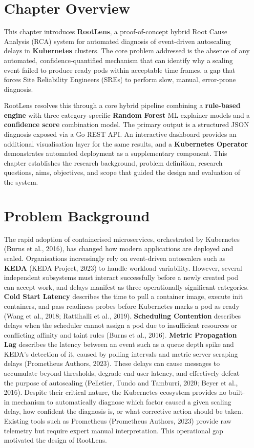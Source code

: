 
\section{Chapter Overview}
This chapter introduces \textbf{RootLens}, a proof-of-concept hybrid Root Cause Analysis (RCA) system for automated diagnosis of event-driven autoscaling delays in \textbf{Kubernetes} clusters. The core problem addressed is the absence of any automated, confidence-quantified mechanism that can identify why a scaling event failed to produce ready pods within acceptable time frames, a gap that forces Site Reliability Engineers (SREs) to perform slow, manual, error-prone diagnosis.

RootLens resolves this through a core hybrid pipeline combining a \textbf{rule-based engine} with three category-specific \textbf{Random Forest} ML explainer models and a \textbf{confidence score} combination model. The primary output is a structured JSON diagnosis exposed via a Go REST API. An interactive dashboard provides an additional visualisation layer for the same results, and a \textbf{Kubernetes Operator} demonstrates automated deployment as a supplementary component. This chapter establishes the research background, problem definition, research questions, aims, objectives, and scope that guided the design and evaluation of the system.

\section{Problem Background}
The rapid adoption of containerised microservices, orchestrated by Kubernetes (Burns et al., 2016), has changed how modern applications are deployed and scaled. Organisations increasingly rely on event-driven autoscalers such as \textbf{KEDA} (KEDA Project, 2023) to handle workload variability. However, several independent subsystems must interact successfully before a newly created pod can accept work, and delays manifest as three operationally significant categories. \textbf{Cold Start Latency} describes the time to pull a container image, execute init containers, and pass readiness probes before Kubernetes marks a pod as ready (Wang et al., 2018; Rattihalli et al., 2019). \textbf{Scheduling Contention} describes delays when the scheduler cannot assign a pod due to insufficient resources or conflicting affinity and taint rules (Burns et al., 2016). \textbf{Metric Propagation Lag} describes the latency between an event such as a queue depth spike and KEDA's detection of it, caused by polling intervals and metric server scraping delays (Prometheus Authors, 2023). These delays can cause messages to accumulate beyond thresholds, degrade end-user latency, and effectively defeat the purpose of autoscaling (Pelletier, Tundo and Tamburri, 2020; Beyer et al., 2016). Despite their critical nature, the Kubernetes ecosystem provides no built-in mechanism to automatically diagnose which factor caused a given scaling delay, how confident the diagnosis is, or what corrective action should be taken. Existing tools such as Prometheus (Prometheus Authors, 2023) provide raw telemetry but require expert manual interpretation. This operational gap motivated the design of RootLens.

